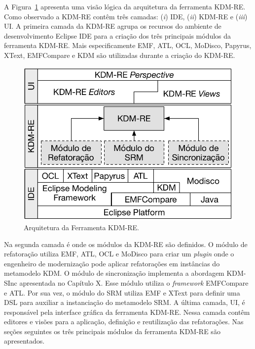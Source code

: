 A Figura~\ref{fig:arquitetura_ferramenta_kdm_re} apresenta uma visão lógica da arquitetura da ferramenta KDM-RE. Como observado a KDM-RE contêm três camadas: (\textit{i}) IDE, (\textit{ii}) KDM-RE e (\textit{iii}) UI. A primeira camada da KDM-RE agrupa os recursos do ambiente de desenvolvimento Eclipse IDE para a criação dos três principais módulos da ferramenta KDM-RE. Mais especificamente EMF, ATL, OCL, MoDisco, Papyrus, XText, EMFCompare e KDM são utilizadas durante a criação do KDM-RE. 

\begin{figure}[h]
	\centering
	\caption{Arquitetura da Ferramenta KDM-RE.}
	\label{fig:arquitetura_ferramenta_kdm_re}
	\includegraphics[scale=0.75]{images/arquitetura_KDM-RE}
	\fautor
\end{figure}

Na segunda camada é onde os módulos da KDM-RE são definidos. O módulo de refatoração utiliza EMF, ATL, OCL e MoDisco para criar um \textit{plugin} onde o engenheiro de modernização pode aplicar refatorações em instâncias do metamodelo KDM. O módulo de sincronização implementa a abordagem KDM-SInc apresentada no Capítulo X. Esse módulo utiliza o \textit{framework} EMFCompare e ATL. Por sua vez, o módulo do SRM utiliza EMF e XText para definir uma DSL para auxiliar a instanciação do metamodelo SRM.  A última camada, UI, é responsável pela interface gráfica da ferramenta KDM-RE. Nessa camada contêm editores e visões para a aplicação, definição e reutilização das refatorações. Nas seções seguintes os três principais módulos da ferramenta KDM-RE são apresentados.


